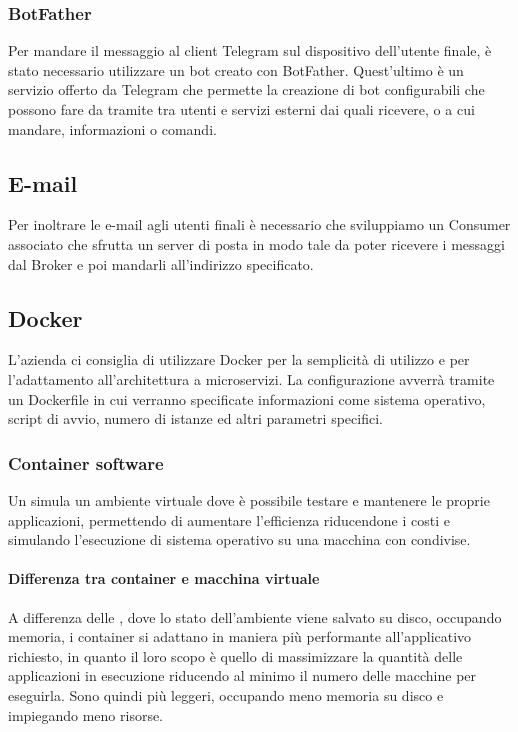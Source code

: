 		\subsubsection{BotFather}
		
		Per mandare il messaggio al client Telegram sul dispositivo dell'utente finale, è stato necessario utilizzare un bot creato con BotFather.
		Quest'ultimo è un servizio offerto da Telegram che permette la creazione di bot configurabili che possono fare da tramite tra utenti e servizi esterni dai quali ricevere, o a cui mandare, informazioni o comandi.
		
		\subsection{E-mail}
		Per inoltrare le e-mail agli utenti finali è necessario che sviluppiamo un Consumer associato che sfrutta un server di posta
        in modo tale da poter ricevere i messaggi dal Broker e poi mandarli all'indirizzo specificato.
		
		\subsection{Docker}
		L'azienda ci consiglia di utilizzare Docker per la semplicità di utilizzo e per l'adattamento all'architettura a microservizi.
		La configurazione avverrà tramite un Dockerfile in cui verranno specificate informazioni come sistema operativo, script di avvio,
        numero di istanze ed altri parametri specifici.
        
        \subsubsection{Container software}\label{TecnologieContainer}
        
        Un  simula un ambiente virtuale dove è possibile testare e mantenere le proprie applicazioni, permettendo di aumentare l'efficienza riducendone i costi e simulando l'esecuzione di sistema operativo su una macchina con  condivise.
        
        \paragraph{Differenza tra container e macchina virtuale}
        A differenza delle , dove lo stato dell'ambiente viene salvato su disco, occupando memoria, i container si adattano in maniera più performante all'applicativo richiesto, in quanto il loro scopo è quello di massimizzare la quantità delle applicazioni in esecuzione riducendo al minimo il numero delle macchine per eseguirla.
        Sono quindi più leggeri, occupando meno memoria su disco e impiegando meno risorse.
        
